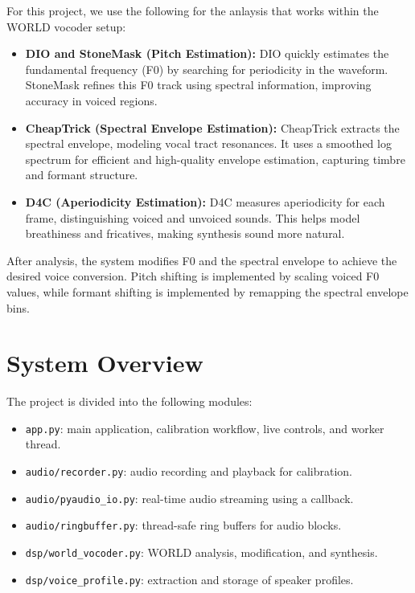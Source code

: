 \documentclass[11pt]{article}
\begin{document}
For this project, we use the following for the anlaysis that works within the WORLD vocoder setup:

\begin{itemize}
    \item \textbf{DIO and StoneMask (Pitch Estimation):} DIO quickly estimates the fundamental frequency (F0) by searching for periodicity in the waveform. StoneMask refines this F0 track using spectral information, improving accuracy in voiced regions.
    \item \textbf{CheapTrick (Spectral Envelope Estimation):} CheapTrick extracts the spectral envelope, modeling vocal tract resonances. It uses a smoothed log spectrum for efficient and high-quality envelope estimation, capturing timbre and formant structure.
    \item \textbf{D4C (Aperiodicity Estimation):} D4C measures aperiodicity for each frame, distinguishing voiced and unvoiced sounds. This helps model breathiness and fricatives, making synthesis sound more natural.
\end{itemize}

After analysis, the system modifies F0 and the spectral envelope to achieve the desired voice conversion. Pitch shifting is implemented by scaling voiced F0 values, while formant shifting is implemented by remapping the spectral envelope bins.

\pagebreak

\section{System Overview}
The project is divided into the following modules:
\begin{itemize}
    \item \texttt{app.py}: main application, calibration workflow, live controls, and worker thread.
    \item \texttt{audio/recorder.py}: audio recording and playback for calibration.
    \item \texttt{audio/pyaudio\_io.py}: real-time audio streaming using a callback.
    \item \texttt{audio/ringbuffer.py}: thread-safe ring buffers for audio blocks.
    \item \texttt{dsp/world\_vocoder.py}: WORLD analysis, modification, and synthesis.
    \item \texttt{dsp/voice\_profile.py}: extraction and storage of speaker profiles.
\end{itemize}
\end{document}

